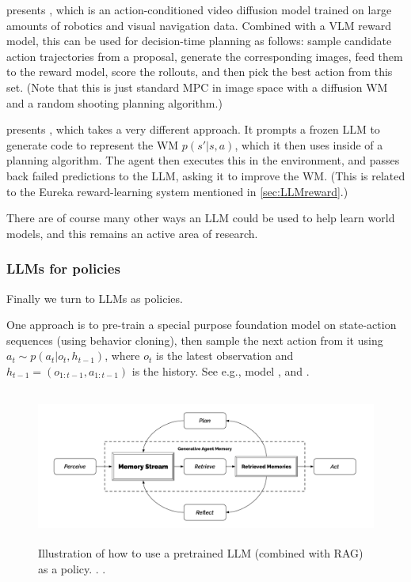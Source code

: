 
\citep{unisim} presents ,
which is an action-conditioned video diffusion model
trained on large amounts of robotics and visual navigation data.
Combined with a VLM reward model, this can be used
for decision-time planning as follows:
sample  candidate action
trajectories from a proposal,
generate the corresponding images,
feed them to the reward model,
score the rollouts,
and then pick the best action from this set.
(Note that this is just standard MPC in image space with a
diffusion WM and a random shooting planning algorithm.)

 \citep{Tang2024}
 presents ,
 which takes a very different approach.
It prompts a frozen LLM to generate code to represent
the WM $p(s'|s,a)$, which it then uses inside of a planning
algorithm. The agent then executes this in the environment,
and passes back failed predictions to the LLM, asking
it to improve the WM.
(This is related to the Eureka reward-learning system
mentioned in \cref{sec:LLMreward}.)

There are of course many other ways an LLM could be used to help
learn world models, and this remains an active area of research.

\subsubsection{LLMs for policies}

Finally we turn to LLMs as policies.

One approach 
is to pre-train a special purpose
foundation model  on state-action sequences (using behavior cloning),
then sample the next action
from it using $a_t \sim p(a_t|o_t,h_{t-1})$,
where $o_t$ is the latest observation
and $h_{t-1}=(o_{1:t-1},a_{1:t-1})$ is the history.
See e.g.,  model \citep{gato}
 \citep{Zitkovich2023},
and  \citep{Bousmalis2023}.

\begin{figure}
\centering
\includegraphics[height=2in]{figs/smallville}
\caption{
  Illustration of how to use a pretrained LLM (combined with RAG)
  as a policy.
  .
  .
  }
\label{fig:smallville}
\end{figure}

